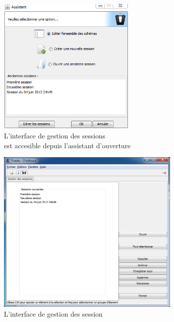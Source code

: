 \begin{figure}[h!]
\centering
\includegraphics[width=0.6\textwidth]{../images/ouverture_session.png}
\caption{L'interface de gestion des sessions\\est accesible depuis l'assistant d'ouverture}
\end{figure}

\begin{figure}[h!]
\centering
\includegraphics[width=0.8\textwidth]{../images/gestion_session.png}
\caption{L'interface de gestion des session}
\end{figure}

